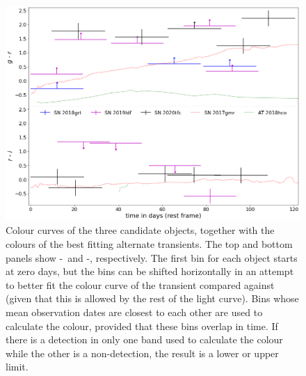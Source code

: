 \documentclass[a4paper,oneside,12pt, class=Latex/Classes/PhDthesisPSnPDF, crop=false]{standalone}
\begin{document}
\begin{figure}
 \centering
 \includegraphics[width=13cm]{../Images/chapter_3/candid_colours.png}
 \caption{Colour curves of the three candidate objects, together with the colours of the best fitting alternate transients. The top and bottom panels show \ztfg-\ztfr\ and \ztfr-\ztfi, respectively. The first bin for each object starts at zero days, but the bins can be shifted horizontally in an attempt to better fit the colour curve of the transient compared against (given that this is allowed by the rest of the light curve). Bins whose mean observation dates are closest to each other are used to calculate the colour, provided that these bins overlap in time. If there is a detection in only one band used to calculate the colour while the other is a non-detection, the result is a lower or upper limit.}
 \label{candidate_colours}
\end{figure}
\end{document}
